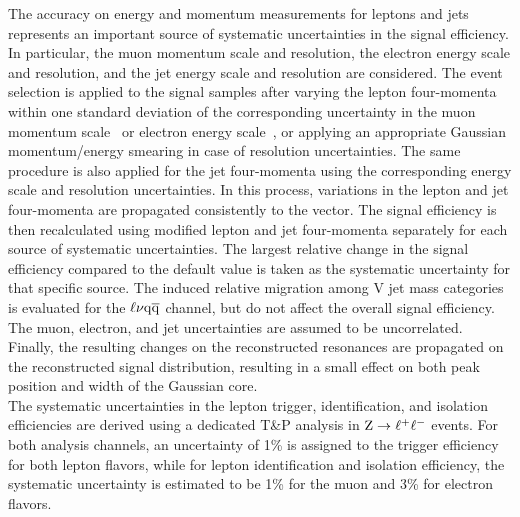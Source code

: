 The accuracy on energy and momentum measurements for leptons and jets represents an important source of systematic uncertainties in the signal efficiency.
In particular, the muon momentum scale and resolution, the electron energy scale and resolution, and the jet energy scale and resolution are considered.
The event selection is applied to the signal samples after varying the lepton four-momenta within one standard deviation of the corresponding uncertainty
in the muon momentum scale~\cite{Chatrchyan:2012xi} or electron energy scale~\cite{Chatrchyan:2013dga}, or applying an appropriate Gaussian momentum/energy smearing in case of resolution uncertainties.
The same procedure is also applied for the jet four-momenta using the corresponding energy scale and resolution uncertainties.
In this process, variations in the lepton and jet four-momenta are propagated consistently to the \ptvecmiss vector.
The signal efficiency is then recalculated using modified lepton and jet four-momenta separately for each source of systematic uncertainties.
The largest relative change in the signal efficiency compared to the default value is taken as the systematic uncertainty for that specific source.
The induced relative migration among V jet mass categories is evaluated for the $\ell\nu\mathrm{q}\overline{\mathrm{q}}$ channel, but do not affect the overall signal efficiency. The muon, electron, and jet uncertainties are assumed to be uncorrelated. 
Finally, the resulting changes on the reconstructed resonances are propagated on the reconstructed \mlvj signal distribution, resulting in a small effect on both peak position and width of the Gaussian core.\\ 

The systematic uncertainties in the lepton trigger, identification, and isolation efficiencies are derived using a dedicated T\&P analysis in $\mathrm{Z}\rightarrow\ell^+\ell^-$ events.
For both analysis channels, an uncertainty of 1\% is assigned to the trigger efficiency for both lepton flavors,
while for lepton identification and isolation efficiency, the systematic uncertainty is estimated to be 1\% for the muon and 3\% for electron flavors.\\

